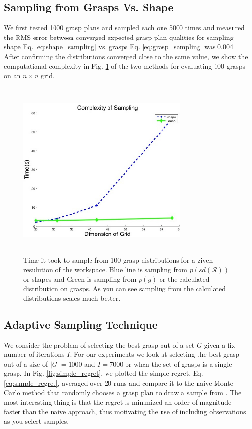 \documentclass[letterpaper, 10 pt, conference]{ieeeconf}  %
\begin{document}
\subsection{Sampling from Grasps Vs. Shape}
We first tested 1000 grasp plans and sampled each one 5000 times  and measured the RMS error between converged expected grasp plan qualities for sampling shape Eq. \ref{eq:shape_sampling} vs. grasps  Eq. \ref{eq:grasp_sampling} was 0.004. After confirming the distributions converged close to the same value, we show the computational complexity in Fig. \ref{fig:speed_dif} of the two methods for evaluating 100 grasps on an $n \times n$ grid. 



\begin{figure}[ht!]
\centering
\includegraphics[width=8.5cm,height=9cm]{figures/Slide12.jpg}
\caption{ \footnotesize Time it took to sample from 100 grasp distributions for a given resulution of the workspace. Blue line is sampling from $p(sd(\mathcal{R}))$ or shapes and Green is sampling from $p(g)$ or the calculated distribution on grasps. As you can see sampling from the calculated distributions scales much better. }
\vspace*{-10pt}
\label{fig:speed_dif}
\end{figure}





\subsection{Adaptive Sampling Technique}

We consider the problem of selecting the best grasp out of a set $G$ given a fix number of iterations $I$. For our experiments we look at selecting the best grasp out of a size of $|G| = 1000$ and $I= 7000$ or when the set of grasps is a single grasp. In Fig. \ref{fig:simple_regret}, we plotted the simple regret, Eq. \ref{eq:simple_regret}, averaged over 20 runs and compare it to the naive Monte-Carlo method that randomly chooses a grasp plan to draw a sample from . The most interesting thing is that the regret is minimized an order of magnitude faster than the naive approach, thus motivating the use of including observations as you select samples. 
\end{document}
